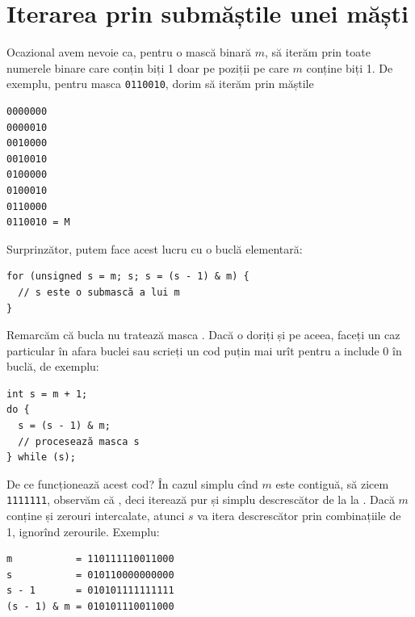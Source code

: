 \section{Iterarea prin submăștile unei măști}

Ocazional avem nevoie ca, pentru o mască binară $m$, să iterăm prin toate numerele binare care conțin biți 1 doar pe poziții pe care $m$ conține biți 1. De exemplu, pentru masca \texttt{0110010}, dorim să iterăm prin măștile

\begin{verbatim}
0000000
0000010
0010000
0010010
0100000
0100010
0110000
0110010 = M
\end{verbatim}

Surprinzător, putem face acest lucru cu o buclă elementară:

\begin{verbatim}
for (unsigned s = m; s; s = (s - 1) & m) {
  // s este o submască a lui m
}
\end{verbatim}

Remarcăm că bucla nu tratează masca . Dacă o doriți și pe aceea, faceți un caz particular în afara buclei sau scrieți un cod puțin mai urît pentru a include 0 în buclă, de exemplu:

\begin{verbatim}
int s = m + 1;
do {
  s = (s - 1) & m;
  // procesează masca s
} while (s);
\end{verbatim}

De ce funcționează acest cod? În cazul simplu cînd $m$ este contiguă, să zicem \texttt{1111111}, observăm că , deci  iterează pur și simplu descrescător de la  la . Dacă $m$ conține și zerouri intercalate, atunci $s$ va itera descrescător prin combinațiile de 1, ignorînd zerourile. Exemplu:

\begin{verbatim}
m           = 110111110011000
s           = 010110000000000
s - 1       = 010101111111111
(s - 1) & m = 010101110011000
\end{verbatim}
